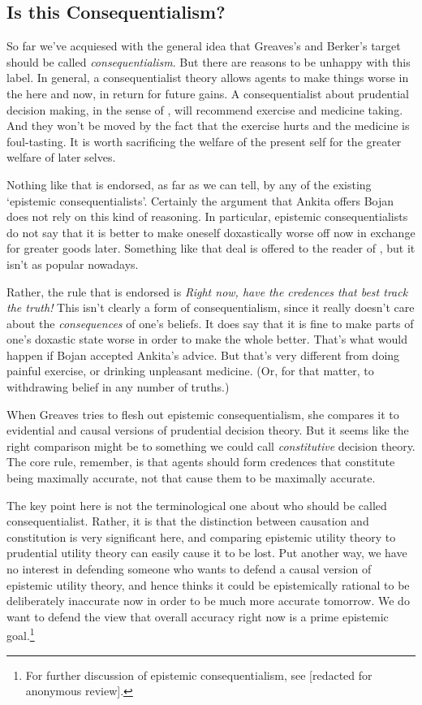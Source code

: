\subsection{Is this Consequentialism?}
\label{isthisconsequentialism}

So far we've acquiesed with the general idea that Greaves's and Berker's target should be called \emph{consequentialism}. But there are reasons to be unhappy with this label. In general, a consequentialist theory allows agents to make things worse in the here and now, in return for future gains. A consequentialist about prudential decision making, in the sense of \citet{Hammond1988}, will recommend exercise and medicine taking. And they won't be moved by the fact that the exercise hurts and the medicine is foul-tasting. It is worth sacrificing the welfare of the present self for the greater welfare of later selves.

Nothing like that is endorsed, as far as we can tell, by any of the existing `epistemic consequentialists'. Certainly the argument that Ankita offers Bojan does not rely on this kind of reasoning. In particular, epistemic consequentialists do not say that it is better to make oneself doxastically worse off now in exchange for greater goods later. Something like that deal is offered to the reader of  \citet{DescartesMeditations}, but it isn't as popular nowadays.

Rather, the rule that is endorsed is \emph{Right now, have the credences that best track the truth!} This isn't clearly a form of consequentialism, since it really doesn't care about the \emph{consequences} of one's beliefs. It does say that it is fine to make parts of one's doxastic state worse in order to make the whole better. That's what would happen if Bojan accepted Ankita's advice. But that's very different from doing painful exercise, or drinking unpleasant medicine. (Or, for that matter, to withdrawing belief in any number of truths.)

When Greaves tries to flesh out epistemic consequentialism, she compares it to evidential and causal versions of prudential decision theory. But it seems like the right comparison might be to something we could call \emph{constitutive} decision theory. The core rule, remember, is that agents should form credences that constitute being maximally accurate, not that cause them to be maximally accurate.

The key point here is not the terminological one about who should be called consequentialist. Rather, it is that the distinction between causation and constitution is very significant here, and comparing epistemic utility theory to prudential utility theory can easily cause it to be lost. Put another way, we have no interest in defending someone who wants to defend a causal version of epistemic utility theory, and hence thinks it could be epistemically rational to be deliberately inaccurate now in order to be much more accurate tomorrow. We do want to defend the view that overall accuracy right now is a prime epistemic goal.\footnote{For further discussion of epistemic consequentialism, see [redacted for anonymous review].}

